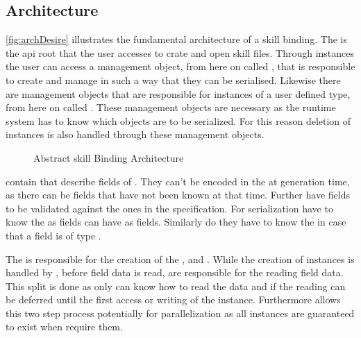 \documentclass[thesis]{subfiles}
\begin{document}
  \subsection{Architecture}\label{sec:skillArch}
    \autoref{fig:archDesire} illustrates the fundamental architecture of a \gls{skill} binding.
    The \SkillFile is the \gls{api} root that the user accesses to crate and open \gls{skill} files.
    Through \SkillFile instances the user can access a management object, from here on called \StringPool, that is responsible to create and manage \Strings in such a way that they can be serialised.
    Likewise there are management objects that are responsible for instances of a user defined type, from here on called \UserTypePools.
    These management objects are necessary as the runtime system has to know which objects are to be serialized.
    For this reason deletion of instances is also handled through these management objects.
    \autocite[107--112]{skill-dis}

    \begin{figure}[ht]
      \centering
      
      \caption{Abstract \gls{skill} Binding Architecture}\label{fig:archDesire}
    \end{figure}

    \UserTypePools contain \FieldDeclarations that describe fields of \UserTypes.
    They can't be encoded in the \UserTypePools at generation time, as there can be fields that have not been known at that time.
    Further have fields to be validated against the ones in the specification.
    For serialization \FieldDeclarations have to know the \UserTypePools as \UserType fields can have \UserTypes as fields.
    Similarly do they have to know the \StringPool in case that a field is of type \String.
    \autocite[144--148]{skill-dis}

    The \FileReader is responsible for the creation of the \StringPool, \UserTypePools and \FieldDeclarations.
    While the creation of \UserType instances is handled by \UserTypePools, before field data is read, \FieldDeclarations are responsible for the reading field data.
    This split is done as only \FieldDeclarations can know how to read the data and if the reading can be deferred until the first access or writing of the instance.
    Furthermore allows this two step process potentially for parallelization as all \UserType instances are guaranteed to exist when \FieldDeclarations require them.
    \autocite[148f.]{skill-dis}
\end{document}
